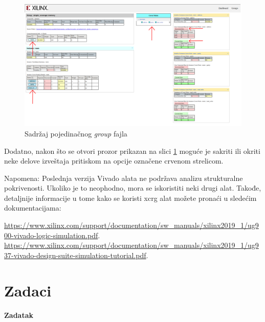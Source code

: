 \begin{figure}[h!]
  \center
  \includegraphics[width=150mm, scale=0.5]{img/v11_coverage_report_group_details.png}
  \caption{Sadržaj pojedinačnog \emph{group} fajla}
  \label{fig:coverage_report_group_details}
\end{figure}

\pagebreak
Dodatno, nakon što se otvori prozor prikazan na slici \ref{fig:coverage_report_group_details} moguće je sakriti ili okriti
neke delove izveštaja pritiskom na opcije označene crvenom strelicom.

\pagebreak
Napomena: Poslednja verzija Vivado alata ne podržava analizu strukturalne pokrivenosti. Ukoliko je to neophodno, mora se iskoristiti
neki drugi alat. Takođe, detaljnije informacije u tome kako se koristi xcrg alat možete pronaći u sledećim dokumentacijama:

\url{https://www.xilinx.com/support/documentation/sw_manuals/xilinx2019_1/ug900-vivado-logic-simulation.pdf}.\\
\url{https://www.xilinx.com/support/documentation/sw_manuals/xilinx2019_1/ug937-vivado-design-suite-simulation-tutorial.pdf}.\\


\section{Zadaci}

\paragraph{Zadatak}

